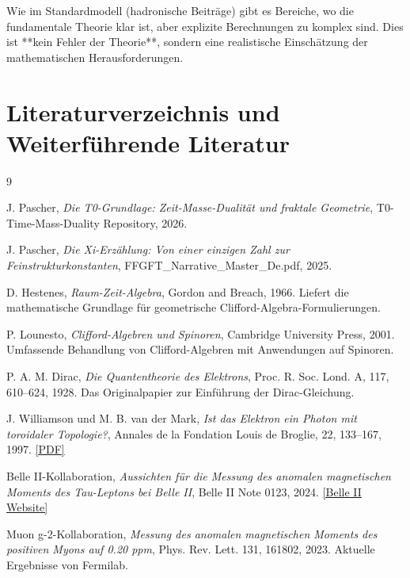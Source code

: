 	Wie im Standardmodell (hadronische Beiträge) gibt es Bereiche, wo die fundamentale 
	Theorie klar ist, aber explizite Berechnungen zu komplex sind. Dies ist **kein 
	Fehler der Theorie**, sondern eine realistische Einschätzung der mathematischen 
	Herausforderungen.
	
\section*{Literaturverzeichnis und Weiterführende Literatur}

\begin{thebibliography}{9}
	
	J. Pascher,
	\textit{Die T0-Grundlage: Zeit-Masse-Dualität und fraktale Geometrie},
	T0-Time-Mass-Duality Repository,
	2026.
	
	J. Pascher,
	\textit{Die Xi-Erzählung: Von einer einzigen Zahl zur Feinstrukturkonstanten},
	FFGFT\_Narrative\_Master\_De.pdf,
	2025.
	
	D. Hestenes,
	\textit{Raum-Zeit-Algebra},
	Gordon and Breach, 1966.
	Liefert die mathematische Grundlage für geometrische Clifford-Algebra-Formulierungen.
	
	P. Lounesto,
	\textit{Clifford-Algebren und Spinoren},
	Cambridge University Press, 2001.
	Umfassende Behandlung von Clifford-Algebren mit Anwendungen auf Spinoren.
	
	P. A. M. Dirac,
	\textit{Die Quantentheorie des Elektrons},
	Proc. R. Soc. Lond. A, 117, 610–624, 1928.
	Das Originalpapier zur Einführung der Dirac-Gleichung.
	
	J. Williamson und M. B. van der Mark,
	\textit{Ist das Elektron ein Photon mit toroidaler Topologie?},
	Annales de la Fondation Louis de Broglie, 22, 133–167, 1997.
	\href{https://fondationlouisdebroglie.org/IMG/pdf/22_2_133.pdf}{[PDF]}
	
	Belle II-Kollaboration,
	\textit{Aussichten für die Messung des anomalen magnetischen Moments des Tau-Leptons bei Belle II},
	Belle II Note 0123, 2024.
	\href{https://www.belle2.org}{[Belle II Website]}
	
	Muon g-2-Kollaboration,
	\textit{Messung des anomalen magnetischen Moments des positiven Myons auf 0.20 ppm},
	Phys. Rev. Lett. 131, 161802, 2023.
	Aktuelle Ergebnisse von Fermilab.
	

\end{thebibliography}
